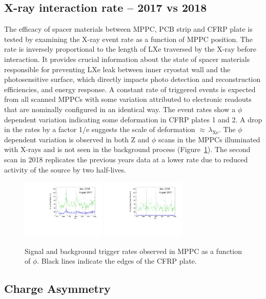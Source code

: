 \subsection { X-ray interaction rate -- 2017 vs 2018}  
The efficacy of spacer materials between MPPC, PCB strip and CFRP
plate is tested by examining the X-ray event rate as a function of
MPPC position. The rate is inversely proportional to the length of LXe
traversed by the X-ray before interaction.  It provides crucial
information about the state of spacer materials responsible for
preventing LXe leak between inner cryostat wall and the photosensitive
surface, which directly impacts photo detection and reconstruction
efficiencies, and energy response.  A constant rate of triggered
events is expected from all scanned MPPCs with some variation
attributed to electronic readouts that are nominally configured in an
identical way.  The event rates show a $\phi$ dependent variation
indicating some deformation in CFRP plates 1 and 2.  A drop in the
rates by a factor 1/e suggests the scale of deformation
$\approx\,\lambda_{\mathrm{Xe}}$.  The $\phi$ dependent variation is
observed in both Z and $\phi$ scans in the MPPCs illuminated with
X-rays and is not seen in the background process
(Figure~\ref{fig:ratesvszphi}).  The second scan in 2018 replicates
the previous years data at a lower rate due to reduced activity of the
source by two half-lives.  
\begin{figure}[]
\includegraphics[width=4cm]{plots/2018/cEventRate_1718}
\includegraphics[width=4cm]{plots/2018/cBkgRate_1718} \caption{Signal
and background trigger rates observed in MPPC as a function of $\phi$.
Black lines indicate the edges of the CFRP plate.}
\label{fig:ratesvszphi} \end{figure}



\subsection{Charge Asymmetry} \label{sec:chargeasym}



